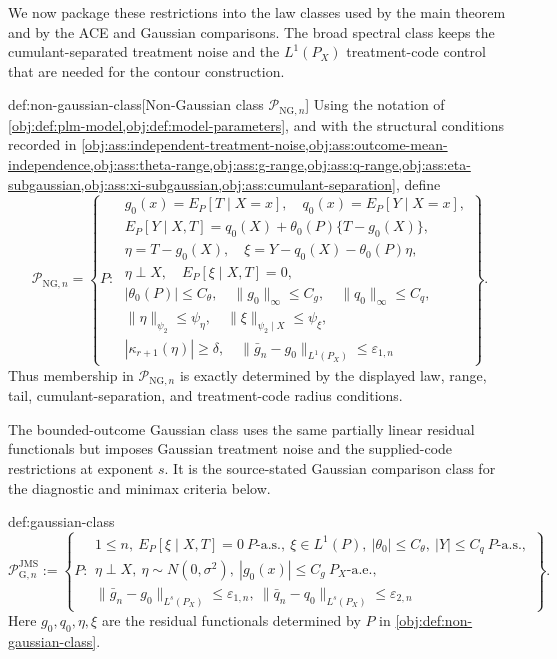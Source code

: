 We now package these restrictions into the law classes used by the main theorem and by the ACE and Gaussian comparisons. The broad spectral class keeps the cumulant-separated treatment noise and the \(L^1(P_X)\) treatment-code control that are needed for the contour construction.

\begin{definitionv}{def:non-gaussian-class}[Non-Gaussian class \(\mathcal P_{\mathrm{NG},n}\)]
Using the notation of \cref{obj:def:plm-model,obj:def:model-parameters}, and with the structural conditions recorded in \cref{obj:ass:independent-treatment-noise,obj:ass:outcome-mean-independence,obj:ass:theta-range,obj:ass:g-range,obj:ass:q-range,obj:ass:eta-subgaussian,obj:ass:xi-subgaussian,obj:ass:cumulant-separation}, define
\[
\mathcal P_{\mathrm{NG},n}
=
\left\{
P:\;
\begin{array}{l}
g_0(x)=E_P[T\mid X=x],\quad q_0(x)=E_P[Y\mid X=x],\\
E_P[Y\mid X,T]=q_0(X)+\theta_0(P)\{T-g_0(X)\},\\
\eta=T-g_0(X),\quad
\xi=Y-q_0(X)-\theta_0(P)\eta,\\
\eta\perp X,\quad E_P[\xi\mid X,T]=0,\\
|\theta_0(P)|\le C_{\theta},\quad
\|g_0\|_{\infty}\le C_g,\quad
\|q_0\|_{\infty}\le C_q,\\
\|\eta\|_{\psi_2}\le\psi_{\eta},\quad
\|\xi\|_{\psi_2\mid X}\le\psi_{\xi},\\
|\kappa_{r+1}(\eta)|\ge\delta,\quad
\|\bar g_n-g_0\|_{L^1(P_X)}\le\varepsilon_{1,n}
\end{array}
\right\}.
\]
Thus membership in \(\mathcal P_{\mathrm{NG},n}\) is exactly determined by the displayed law, range, tail, cumulant-separation, and treatment-code radius conditions.
\end{definitionv}

The bounded-outcome Gaussian class uses the same partially linear residual functionals but imposes Gaussian treatment noise and the supplied-code restrictions at exponent \(s\). It is the source-stated Gaussian comparison class for the diagnostic and minimax criteria below.

\begin{definitionv}{def:gaussian-class}
\[
\mathcal P_{\mathrm G,n}^{\mathrm{JMS}}:=\left\{P:\begin{array}{l}1\le n,\ E_P[\xi\mid X,T]=0\ P\text{-a.s.},\ \xi\in L^1(P),\ |\theta_0|\le C_{\theta},\ |Y|\le C_q\ P\text{-a.s.},\\ \eta\perp X,\ \eta\sim N(0,\sigma^2),\ |g_0(x)|\le C_g\ P_X\text{-a.e.},\\ \|\bar g_n-g_0\|_{L^s(P_X)}\le\varepsilon_{1,n},\ \|\bar q_n-q_0\|_{L^s(P_X)}\le\varepsilon_{2,n}\end{array}\right\}.
\]
Here \(g_0,q_0,\eta,\xi\) are the residual functionals determined by \(P\) in \cref{obj:def:non-gaussian-class}.
\end{definitionv}

